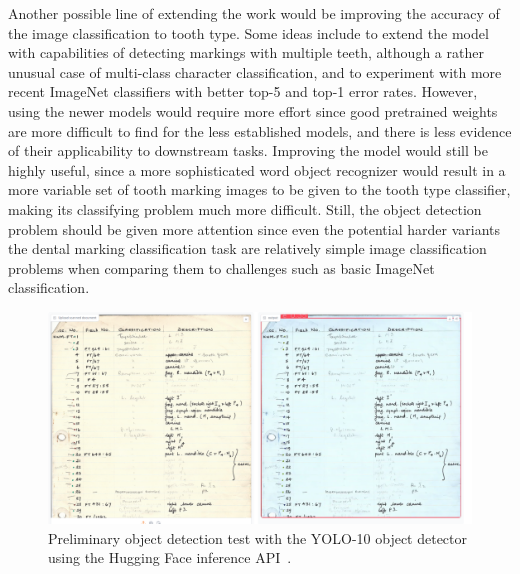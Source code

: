 \documentclass{article}
\begin{document}
Another possible line of extending the work would be improving the accuracy of the image classification to tooth type. 
Some ideas include to extend the model with capabilities of detecting markings with multiple teeth, although
a rather unusual case of multi-class character classification, and to experiment with more recent ImageNet classifiers with better top-5 and top-1 error rates.
However, using the newer models would require more effort since good pretrained weights are 
more difficult to find for the less established models, and there is less evidence of their applicability to downstream tasks.
Improving the model would still be highly useful, since a more sophisticated word object recognizer would result in a more 
variable set of tooth marking images to be given to the tooth type classifier, making its classifying problem much more difficult. 
Still, the object detection problem should be given more attention since even the 
potential harder variants the dental marking classification task are relatively simple image classification problems when comparing 
them to challenges such as basic ImageNet classification.

\begin{figure}[h]
    \centering
    \includegraphics*[scale=0.3]{../images/yoloresult.png}
    \caption{Preliminary object detection test with the YOLO-10 object detector using the Hugging Face inference API~\cite{OmouredYOLOv10DocumentLayoutAnalysisHugging2023}.}
    \label{image:yolo}
\end{figure}
\end{document}
